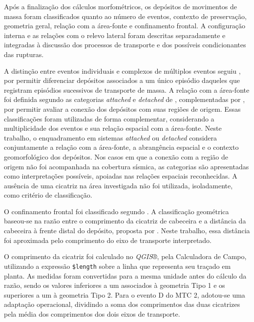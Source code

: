 Após a finalização dos cálculos morfométricos, os depósitos de movimentos de massa foram classificados quanto ao número de eventos, contexto de preservação, geometria geral, relação com a área-fonte e confinamento frontal. A configuração interna e as relações com o relevo lateral foram descritas separadamente e integradas à discussão dos processos de transporte e dos possíveis condicionantes das rupturas.

A distinção entre eventos individuais e complexos de múltiplos eventos seguiu , por permitir diferenciar depósitos associados a um único episódio daqueles que registram episódios sucessivos de transporte de massa. A relação com a área-fonte foi definida segundo as categorias \textit{attached} e \textit{detached} de , complementadas por , por permitir avaliar a conexão dos depósitos com suas regiões de origem. Essas classificações foram utilizadas de forma complementar, considerando a multiplicidade dos eventos e sua relação espacial com a área-fonte. Neste trabalho, o enquadramento em sistemas \textit{attached} ou \textit{detached} considera conjuntamente a relação com a área-fonte, a abrangência espacial e o contexto geomorfológico dos depósitos. Nos casos em que a conexão com a região de origem não foi acompanhada na cobertura sísmica, as categorias são apresentadas como interpretações possíveis, apoiadas nas relações espaciais reconhecidas. A ausência de uma cicatriz na área investigada não foi utilizada, isoladamente, como critério de classificação.

O confinamento frontal foi classificado segundo . A classificação geométrica baseou-se na razão entre o comprimento da cicatriz de cabeceira e a distância da cabeceira à frente distal do depósito, proposta por . Neste trabalho, essa distância foi aproximada pelo comprimento do eixo de transporte interpretado.

O comprimento da cicatriz foi calculado no \textit{QGIS®}, pela Calculadora de Campo, utilizando a expressão \texttt{\$length} sobre a linha que representa seu traçado em planta. As medidas foram convertidas para a mesma unidade antes do cálculo da razão, sendo os valores inferiores a um associados à geometria Tipo 1 e os superiores a um à geometria Tipo 2. Para o evento D do MTC 2, adotou-se uma adaptação operacional, dividindo a soma dos comprimentos das duas cicatrizes pela média dos comprimentos dos dois eixos de transporte.

